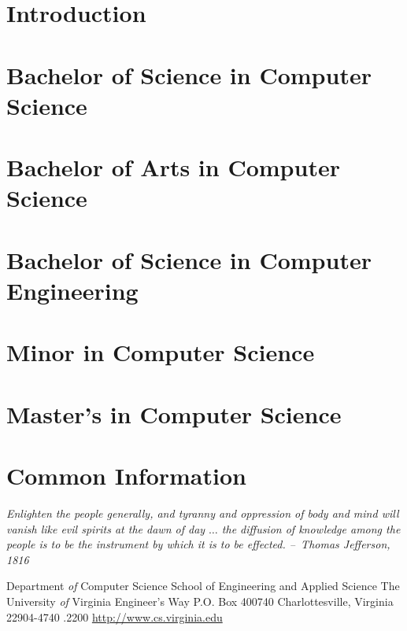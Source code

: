 \documentclass[10pt,letter,twocolumn]{book}
\newcommand{\mychapter}[2]{\chapter{#1}\renewcommand{\leftmark}{\textsc{#2}}}
\begin{document}
\clearpage
\pagestyle{fancy}
\setcounter{page}{1}

\tableofcontents

\cleardoublepage
\setcounter{page}{1}
\mychapter{Introduction}{Introduction}


\clearpage
\mychapter{Bachelor of Science in Computer Science}{BS CS Degree}
\label{bscschapter}


\clearpage
\mychapter{Bachelor of Arts in Computer Science}{BA CS Degree}
\label{bacschapter}


\clearpage
\mychapter{Bachelor of Science in Computer Engineering}{BS CpE Degree}
\label{bscpechapter}


\clearpage
\mychapter{Minor in Computer Science}{CS Minor}
\label{sec:csminor}


\clearpage
\mychapter{Master's in Computer Science}{Masters in CS}
\label{sec:masters}


\clearpage
\mychapter{Common Information}{Common Information}
\label{sec:common}



\cleardoublepage
\pagestyle{empty}

\begin{figure*}
\begin{center}
\parbox{2.5in}{{\em Enlighten the people generally, and tyranny and
    oppression of body and mind will vanish like evil spirits at the
    dawn of day $\dots$ the diffusion of knowledge among the people is to be
    the instrument by which it is to be effected.\linebreak\linebreak
    --~Thomas Jefferson, 1816}}
\end{center}
\end{figure*}

\clearpage

\begin{figure*}
\begin{center}
Department {\em of} Computer Science \linebreak
School of Engineering and Applied Science \linebreak
The University {\em of} Virginia  Engineer's Way \linebreak
P.O. Box 400740 \linebreak
Charlottesville, Virginia 22904-4740 .2200 \linebreak
\url{http://www.cs.virginia.edu} \linebreak
\end{center}

\begin{center}
\end{center}
\end{figure*}
\end{document}
